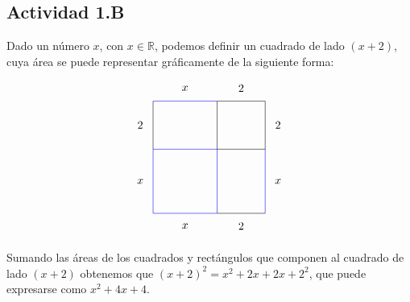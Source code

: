 \subsection*{Actividad 1.B}

Dado un número $x$, con $x \in \mathbb{R}$, podemos definir un cuadrado de lado $(x+2)$, cuya área se puede representar gráficamente de la siguiente forma:

\begin{align*}
\begin{tikzpicture}
\draw[blue] (0,0) rectangle (2,2);
\draw (1, -0.4) node{$x$};
\draw (2,2) rectangle (3.5,3.5);
\draw (3.9, 2.75) node{$2$};
\draw (2,0) -- (3.5,0);
\draw (2.75, -0.4) node{$2$};
\draw[blue] (3.5, 0) -- (3.5, 2);
\draw (3.9, 1) node{$x$};
\draw[blue] (0, 3.5) -- (2, 3.5);
\draw (1, 3.9) node{$x$};
\draw (0, 2) -- (0, 3.5);
\draw (-0.4, 2.75) node{$2$};
\draw (2.75, 3.9) node{$2$};
\draw (-0.4, 1) node{$x$};
\end{tikzpicture}
\end{align*}

Sumando las áreas de los cuadrados y rectángulos que componen al cuadrado de lado $(x+2)$ obtenemos que $(x+2)^2 = x^2 + 2x + 2x + 2^2$, que puede expresarse como $x^2 + 4x +4$.
